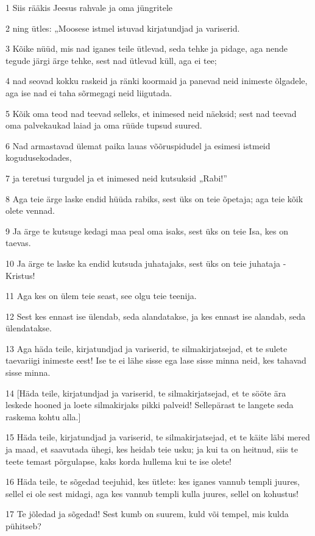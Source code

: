 \par 1 Siis rääkis Jeesus rahvale ja oma jüngritele
\par 2 ning ütles: „Moosese istmel istuvad kirjatundjad ja variserid.
\par 3 Kõike nüüd, mis nad iganes teile ütlevad, seda tehke ja pidage, aga nende tegude järgi ärge tehke, sest nad ütlevad küll, aga ei tee;
\par 4 nad seovad kokku raskeid ja ränki koormaid ja panevad neid inimeste õlgadele, aga ise nad ei taha sõrmegagi neid liigutada.
\par 5 Kõik oma teod nad teevad selleks, et inimesed neid näeksid; sest nad teevad oma palvekaukad laiad ja oma rüüde tupsud suured.
\par 6 Nad armastavad ülemat paika lauas võõruspidudel ja esimesi istmeid kogudusekodades,
\par 7 ja teretusi turgudel ja et inimesed neid kutsuksid „Rabi!”
\par 8 Aga teie ärge laske endid hüüda rabiks, sest üks on teie õpetaja; aga teie kõik olete vennad.
\par 9 Ja ärge te kutsuge kedagi maa peal oma isaks, sest üks on teie Isa, kes on taevas.
\par 10 Ja ärge te laske ka endid kutsuda juhatajaks, sest üks on teie juhataja - Kristus!
\par 11 Aga kes on ülem teie seast, see olgu teie teenija.
\par 12 Sest kes ennast ise ülendab, seda alandatakse, ja kes ennast ise alandab, seda ülendatakse.
\par 13 Aga häda teile, kirjatundjad ja variserid, te silmakirjatsejad, et te sulete taevariigi inimeste eest! Ise te ei lähe sisse ega lase sisse minna neid, kes tahavad sisse minna.
\par 14 [Häda teile, kirjatundjad ja variserid, te silmakirjatsejad, et te sööte ära leskede hooned ja loete silmakirjaks pikki palveid! Sellepärast te langete seda raskema kohtu alla.]
\par 15 Häda teile, kirjatundjad ja variserid, te silmakirjatsejad, et te käite läbi mered ja maad, et saavutada ühegi, kes heidab teie usku; ja kui ta on heitnud, siis te teete temast põrgulapse, kaks korda hullema kui te ise olete!
\par 16 Häda teile, te sõgedad teejuhid, kes ütlete: kes iganes vannub templi juures, sellel ei ole sest midagi, aga kes vannub templi kulla juures, sellel on kohustus!
\par 17 Te jõledad ja sõgedad! Sest kumb on suurem, kuld või tempel, mis kulda pühitseb?

